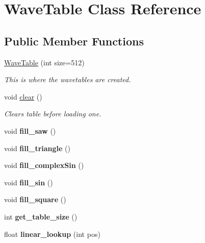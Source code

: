 \hypertarget{class_wave_table}{}\section{Wave\+Table Class Reference}
\label{class_wave_table}
\subsection*{Public Member Functions}
\begin{DoxyCompactItemize}
\item 
\hyperlink{class_wave_table_af257d878d03850933d6fcd717d3e7d46}{Wave\+Table} (int size=512)
\begin{DoxyCompactList}\small\item\em This is where the wavetables are created. \end{DoxyCompactList}\item 
void \hyperlink{class_wave_table_a06fec2282e49931786482082b0d26de2}{clear} ()\hypertarget{class_wave_table_a06fec2282e49931786482082b0d26de2}{}\label{class_wave_table_a06fec2282e49931786482082b0d26de2}

\begin{DoxyCompactList}\small\item\em Clears table before loading one. \end{DoxyCompactList}\item 
void {\bfseries fill\+\_\+saw} ()\hypertarget{class_wave_table_a285a211628cac12adbdda2c991bbd439}{}\label{class_wave_table_a285a211628cac12adbdda2c991bbd439}

\item 
void {\bfseries fill\+\_\+triangle} ()\hypertarget{class_wave_table_a537e8308196b9acda85fe735d0e3f29c}{}\label{class_wave_table_a537e8308196b9acda85fe735d0e3f29c}

\item 
void {\bfseries fill\+\_\+complex\+Sin} ()\hypertarget{class_wave_table_a653ac8a5cf46636e47bcb2ede13634b2}{}\label{class_wave_table_a653ac8a5cf46636e47bcb2ede13634b2}

\item 
void {\bfseries fill\+\_\+sin} ()\hypertarget{class_wave_table_a78105da102793b309af4b79b3b97ac22}{}\label{class_wave_table_a78105da102793b309af4b79b3b97ac22}

\item 
void {\bfseries fill\+\_\+square} ()\hypertarget{class_wave_table_ab7192bd65f32f06696636f0d97aa2a11}{}\label{class_wave_table_ab7192bd65f32f06696636f0d97aa2a11}

\item 
int {\bfseries get\+\_\+table\+\_\+size} ()\hypertarget{class_wave_table_a02c49df4abb9f7a093f43020a54bccb9}{}\label{class_wave_table_a02c49df4abb9f7a093f43020a54bccb9}

\item 
float {\bfseries linear\+\_\+lookup} (int pos)\hypertarget{class_wave_table_a80cc5d3c521b520a3499131615a6b220}{}\label{class_wave_table_a80cc5d3c521b520a3499131615a6b220}

\end{DoxyCompactItemize}


